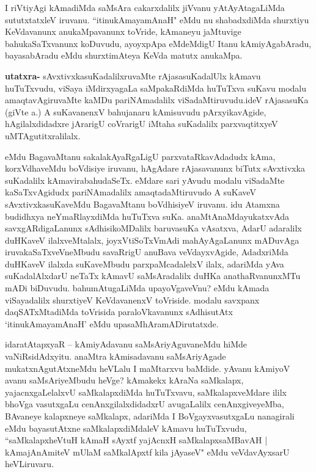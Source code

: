 \begin{artha}
I riVtiyAgi kAmadiMda saMsAra cakarxdalilx jiVvanu yAtAyAtagaLiMda sututxtatxleV iruvanu. ``itinukAmayamAnaH" eMdu nu shabadxdiMda shurxtiyu KeVdavanunx anukaMpavanunx toVride, kAmaneyu jaMtuvige bahukaSaTxvanunx koDuvudu, ayoyxpApa eMdeMdigU Itanu kAmiyAgabAradu, bayasabAradu eMdu shurxtimAteya KeVda matutx anukaMpa.
\end{artha}

\begin{artha}
\textbf{utatxra-} sAvxtivxkasuKadalilxruvaMte rAjasasuKadalUlx kAmavu huTuTxvudu, viSaya iMdirxyagaLa saMpakaRdiMda huTuTxva suKavu modalu amaqtavAgiruvaMte kaMDu pariNAmadalilx viSadaMtiruvudu.ideV rAjasasuKa (giVte a.) A suKavanenxV bahujanaru kAmisuvudu pArxyikavAgide, hAgilalxdidadxre jArarigU coVrarigU iMtaha suKadalilx parxvaqtitxyeV uMTAgutitxralilalx. 
\end{artha}

\begin{artha}
eMdu BagavaMtanu sakalakAyaRgaLigU parxvataRkavAdadudx kAma, korxVdhaveMdu boVdisiye iruvanu, hAgAdare rAjasavanunx biTutx sAvxtivxka suKadalilx kAmavirabahudaSeTx. eMdare sari yAvudu modalu viSadaMte kaSaTxvAgidudx pariNAmadalilx amaqtadaMtiruvudo A suKaveV sAvxtivxkasuKaveMdu BagavaMtanu boVdhisiyeV iruvanu. idu Atamxna budidhxya neYmaRlayxdiMda huTuTxva suKa. anaMtAnaMdayukatxvAda savxgARdigaLanunx sAdhisikoMDalilx baruvasuKa vAsatxva, AdarU adaralilx duHKaveV ilalxveMtalalx, joyxVtiSoTxVmAdi mahAyAgaLanunx mADuvAga iruvakaSaTxveVneMbudu savaRrigU anuBava veVdayxvAgide, AdadxriMda duHKaveV ilalxda suKaveMbudu parxpaMcadalelxV ilalx, adariMda yAva suKadalAlxdarU neTaTx kAmavU saMsAradalilx duHKa anathaRvanunxMTu mADi biDuvudu. bahumAtugaLiMda upayoVgaveVnu? eMdu kAmada viSayadalilx shurxtiyeV KeVdavanenxV toVriside. modalu savxpanx daqSATxMtadiMda toVrisida paraloVkavanunx sAdhisutAtx `itinukAmayamAnaH' eMdu upasaMhAramADirutatxde.
\end{artha}

\begin{artha}
idaratAtapxyaR {\rm --} kAmiyAdavanu saMsAriyAguvaneMdu hiMde vaNiRsidAdxyitu. anaMtra kAmisadavanu saMsAriyAgade mukatxnAgutAtxneMdu heVLalu I maMtarxvu baMdide.
yAvanu kAmiyoV avanu saMsAriyeMbudu heVge? kAmakekx kAraNa saMkalapx, yajacnxgaLelalxvU saMkalapxdiMda huTuTxvavu, saMkalapxveMdare ililx bhoVga vasutxgaLu cenAnxgilalxdidadxrU avugaLalilx cenAnxgiveyeMba, BAvaneye kalapxneye saMkalapx, adariMda I BoVgayxvasutxgaLu nanagirali eMdu bayasutAtxne saMkalapxdiMdaleV kAmavu huTuTxvudu, ``saMkalapxheVtuH kAmaH sAyxtf yajAcnxH saMkalapxsaMBavAH | kAmajAnAmiteV mUlaM saMkalApxtf kila jAyaseV" eMdu veVdavAyxsarU heVLiruvaru.
\end{artha}


